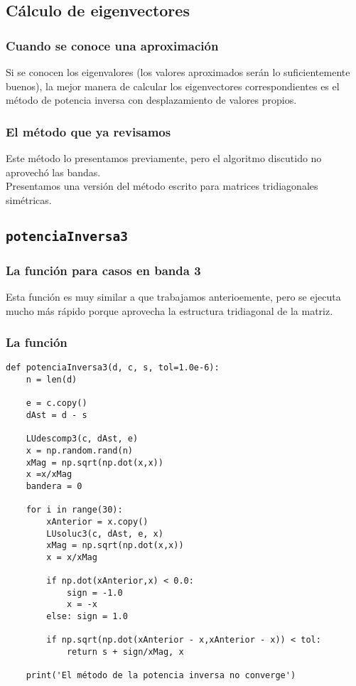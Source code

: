\documentclass[12pt]{beamer}
\begin{document}
\subsection{Cálculo de eigenvectores}

\begin{frame}
\frametitle{Cuando se conoce una aproximación}
Si se conocen los eigenvalores (los valores aproximados serán lo suficientemente buenos), \pause la mejor manera de calcular los eigenvectores correspondientes es el método de potencia inversa con desplazamiento de valores propios.
\end{frame}
\begin{frame}
\frametitle{El método que ya revisamos}
Este método lo presentamos previamente, pero el algoritmo discutido no aprovechó las bandas.
\\
\bigskip
\pause
Presentamos una versión del método escrito para matrices tridiagonales simétricas.
\end{frame}

\subsection{\texttt{potenciaInversa3}}

\begin{frame}
\frametitle{La función para casos en banda 3}
Esta función  es muy similar a  que trabajamos anterioemente, pero se ejecuta mucho más rápido porque aprovecha la estructura tridiagonal de la matriz.
\end{frame}
\begin{frame}
\frametitle{La función}
\begin{lstlisting}[caption=Código para el cálculo de eigenvectores en 3 banda]
def potenciaInversa3(d, c, s, tol=1.0e-6):
    n = len(d)
    
    e = c.copy()
    dAst = d - s
    
    LUdescomp3(c, dAst, e)
    x = np.random.rand(n)
    xMag = np.sqrt(np.dot(x,x))
    x =x/xMag
    bandera = 0
    
    for i in range(30):
        xAnterior = x.copy()
        LUsoluc3(c, dAst, e, x)
        xMag = np.sqrt(np.dot(x,x))
        x = x/xMag
        
        if np.dot(xAnterior,x) < 0.0:
            sign = -1.0
            x = -x
        else: sign = 1.0
        
        if np.sqrt(np.dot(xAnterior - x,xAnterior - x)) < tol:
            return s + sign/xMag, x
    
    print('El método de la potencia inversa no converge')
\end{lstlisting}
\end{frame}
\end{document}
